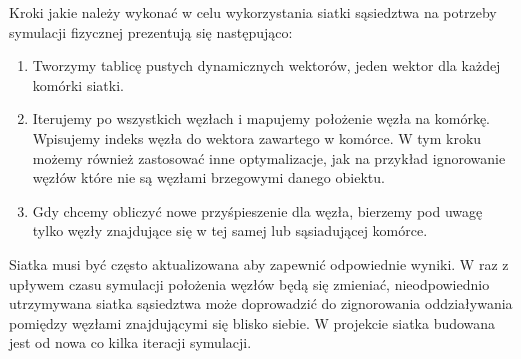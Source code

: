 \documentclass[12pt, letterpaper]{report}
\begin{document}
    Kroki jakie należy wykonać w celu wykorzystania siatki sąsiedztwa na 
    potrzeby symulacji fizycznej prezentują się następująco:
    \begin{enumerate}
        \item Tworzymy tablicę pustych dynamicznych wektorów, jeden wektor dla każdej komórki siatki.

        \item Iterujemy po wszystkich węzłach i mapujemy położenie węzła na komórkę. Wpisujemy indeks węzła 
        do wektora zawartego w komórce. W tym kroku możemy również zastosować inne optymalizacje, jak na przykład 
        ignorowanie węzłów które nie są węzłami brzegowymi danego obiektu.

        \item Gdy chcemy obliczyć nowe przyśpieszenie dla węzła, bierzemy pod uwagę tylko węzły znajdujące 
        się w tej samej lub sąsiadującej komórce.
    \end{enumerate}

    Siatka musi być często aktualizowana aby zapewnić odpowiednie wyniki. W raz z upływem czasu symulacji położenia
    węzłów będą się zmieniać, nieodpowiednio utrzymywana siatka sąsiedztwa może doprowadzić do zignorowania 
    oddziaływania pomiędzy węzłami znajdującymi się blisko siebie. W projekcie siatka budowana jest od nowa 
    co kilka iteracji symulacji.
\end{document}
